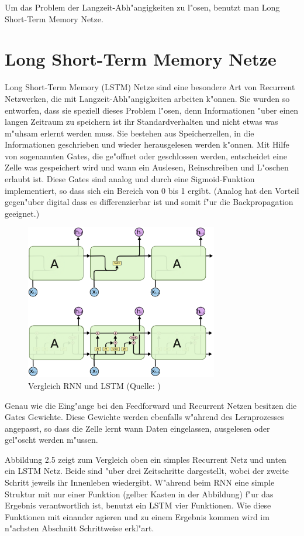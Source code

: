 {Um das Problem der Langzeit-Abh"angigkeiten zu l"osen, benutzt man Long Short-Term Memory Netze.


\section{Long Short-Term Memory Netze}
Long Short-Term Memory (LSTM) Netze sind eine besondere Art von Recurrent Netzwerken, die mit Langzeit-Abh"angigkeiten arbeiten k"onnen. Sie wurden so entworfen, dass sie speziell dieses Problem l"osen, denn Informationen "uber einen langen Zeitraum zu speichern ist ihr Standardverhalten und nicht etwas was m"uhsam erlernt werden muss. Sie bestehen aus Speicherzellen, in die Informationen geschrieben und wieder herausgelesen werden k"onnen. Mit Hilfe von sogenannten Gates, die ge"offnet oder geschlossen werden, entscheidet eine Zelle was gespeichert wird und wann ein Auslesen, Reinschreiben und L"oschen erlaubt ist. Diese Gates sind analog und durch eine Sigmoid-Funktion implementiert, so dass sich ein Bereich von 0 bis 1 ergibt. (Analog hat den Vorteil gegen"uber digital dass es differenzierbar ist und somit f"ur die Backpropagation geeignet.)
\renewcommand{\figurename}{Abb.}
\begin{figure}[htb]
\centering
\includegraphics[width=0.75\textwidth]{pictures/SRN-LSTM-chain.png}
\caption[Vergleich RNN und LSTM]{Vergleich RNN und LSTM (Quelle: \cite{OlahImg})}
\end{figure}
Genau wie die Eing"ange bei den Feedforward und Recurrent Netzen besitzen die Gates Gewichte. Diese Gewichte werden ebenfalls w"ahrend des Lernprozesses angepasst, so dass die Zelle lernt wann Daten eingelassen, ausgelesen oder gel"oscht werden m"ussen.

Abbildung 2.5 zeigt zum Vergleich oben ein simples Recurrent Netz und unten ein LSTM Netz. Beide sind "uber drei Zeitschritte dargestellt, wobei der zweite Schritt jeweils ihr Innenleben wiedergibt. W"ahrend beim RNN eine simple Struktur mit nur einer Funktion (gelber Kasten in der Abbildung) f"ur das Ergebnis verantwortlich ist, benutzt ein LSTM vier Funktionen. Wie diese Funktionen mit einander agieren und zu einem Ergebnis kommen wird im n"achsten Abschnitt Schrittweise erkl"art.


}
